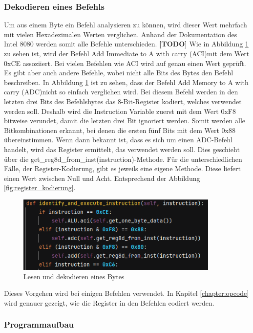 \documentclass[12pt]{article}
\newcommand{\imgSpaceBefore}{\vspace{10pt}}
\begin{document}
\subsubsection{Dekodieren eines Befehls}
\noindent
Um aus einem Byte ein Befehl analysieren zu können, wird dieser Wert mehrfach mit vielen Hexadezimalen Werten verglichen. Anhand der Dokumentation des Intel 8080 werden somit alle Befehle unterschieden. 
\textbf{[TODO]} Wie in  Abbildung \ref{fig:ReadInstruction} zu sehen ist, wird der Befehl \glqq Add Immediate to A with carry (ACI)\grqq mit dem Wert 0xCE assoziiert.  
Bei vielen Befehlen wie ACI wird auf genau einen Wert geprüft. Es gibt aber auch andere Befehle, wobei nicht alle Bits des Bytes den Befehl beschreiben. In Abbildung \ref{fig:ReadInstruction} ist zu sehen, dass der Befehl \glqq Add Memory to A with carry (ADC)\grqq nicht so einfach verglichen wird. Bei diesem Befehl werden in den letzten drei Bits des Befehlsbytes das 8-Bit-Register kodiert, welches verwendet werden soll. Deshalb wird die Instruction Variable zuerst mit dem Wert 0xF8 bitweise verundet, damit die letzten drei Bit ignoriert werden. Somit werden alle Bitkombinationen erkannt, bei denen die ersten fünf Bits mit dem Wert 0x88 übereinstimmen. Wenn dann bekannt ist, dass es sich um einen ADC-Befehl handelt, wird das Register ermittelt, das verwendet werden soll. Dies geschieht über die get\_reg8d\_from\_inst(instruction)-Methode. Für die unterschiedlichen Fälle, der Register-Kodierung, gibt es jeweils eine eigene Methode. Diese liefert einen Wert zwischen Null und Acht. Entsprechend der Abbildung \ref{fig:register_kodierung}.\imgSpaceBefore

\begin{figure}[h]
\centering
\includegraphics[width=10cm]{Bilder/ReadInstruction}
\caption{Lesen und dekodieren eines Bytes}
\label{fig:ReadInstruction}
\end{figure}

\noindent
Dieses Vorgehen wird bei einigen Befehlen verwendet. In Kapitel \ref{chapter:opcode} wird genauer gezeigt, wie die Register in den Befehlen codiert werden.


\subsubsection{Programmaufbau}
\label{chapter:MPS_aufbau}
\end{document}
